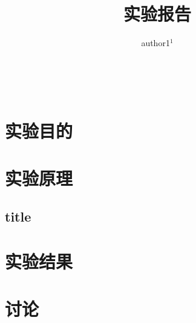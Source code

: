 \documentclass[hyperref]{ctexart}
\title{\textbf{实验报告}}
\author{\sffamily author1$^1$}
\date{}
\begin{document}
\maketitle
{}\\	
\begin{multicols}{2}
\section{实验目的}

\section{实验原理}
	\subsection{title}
\section{实验结果}

\section{讨论}

\end{multicols}
\end{document}
